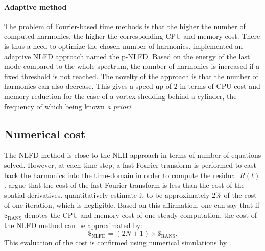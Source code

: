 \paragraph{Adaptive method}
The problem of Fourier-based time methods is that the higher
the number of computed harmonics, the higher the corresponding
CPU and memory cost. There is thus a need to optimize
the chosen number of harmonics.
\citet{Mosahebi2013} implemented an adaptive NLFD approach named
the p-NLFD. Based on the energy of the last mode compared
to the whole spectrum, the number of harmonics
is increased if a fixed threshold is not reached.
The novelty of the approach is that the number of
harmonics can also decrease.
This gives a speed-up of $2$ in terms of CPU cost and
memory reduction for the case of a
vortex-shedding behind a cylinder, the frequency of which
being known \emph{a priori}.

\subsection{Numerical cost}
The NLFD method is close to the NLH approach in terms of number
of equations solved. However, at each time-step, a fast Fourier transform
is performed to cast back the harmonics into the time-domain in order
to compute the residual $R(t)$. \citet{McMullen2006} argue
that the cost of the fast Fourier transform is less than the cost of 
the spatial derivatives. 
\citet{Kachra2008} quantitatively estimate it to be
approximately $2\%$ of the cost of one iteration, which is negligible.
Based on this affirmation, one can say that 
if $\mathdollar_{\text{RANS}}$ 
denotes the CPU and memory cost of
one steady computation, the cost of the NLFD method can be 
approximated by:
\begin{equation}
	\mathdollar_{\text{NLFD}} = (2N+1) \times \mathdollar_{\text{RANS}}.
\end{equation}
This evaluation of the cost is confirmed using numerical
simulations by \citet{McMullen2002}.